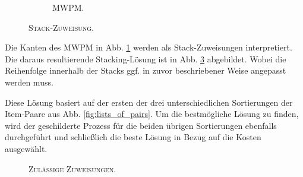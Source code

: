\begin{figure}[H]
\begin{subfigure}[b]{0.4\textwidth}
\caption{\textsc{MWPM}.}
\label{fig:mwpm}
\end{subfigure}
\caption{\textsc{Stack-Zuweisung}.}
\label{}
\end{figure}

Die Kanten des \textsc{MWPM} in Abb. \ref{fig:mwpm} werden als Stack-Zuweisungen interpretiert.
Die daraus resultierende Stacking-Lösung ist in Abb. \ref{fig:valid_solution} abgebildet. Wobei die Reihenfolge
innerhalb der Stacks ggf. in zuvor beschriebener Weise angepasst werden muss.

Diese Lösung basiert auf der ersten der drei unterschiedlichen Sortierungen der Item-Paare aus Abb. \ref{fig:lists_of_pairs}.
Um die bestmögliche Lösung zu finden, wird der geschilderte Prozess für die beiden übrigen Sortierungen
ebenfalls durchgeführt und schließlich die beste Lösung in Bezug auf die Kosten ausgewählt.

\begin{figure}[H]
  \centering
    \caption{\textsc{Zulässige Zuweisungen.}}
    \label{fig:valid_solution}
\end{figure}

